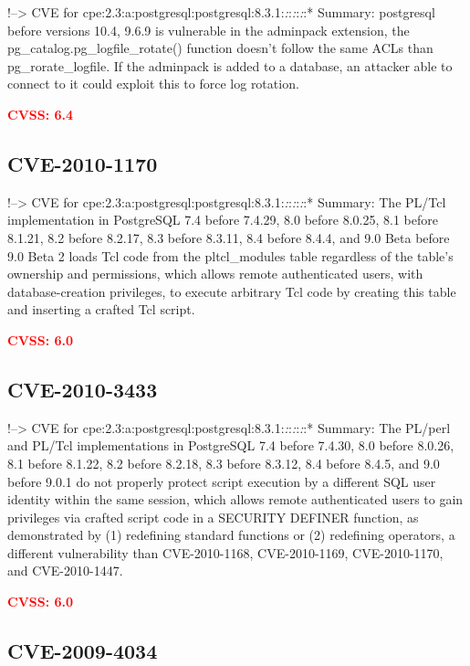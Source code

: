 \documentclass[a4paper, 12pt]{article}
\begin{document}
!--\textgreater{} CVE for
cpe:2.3:a:postgresql:postgresql:8.3.1:\emph{:}:\emph{:}:\emph{:}:*
Summary: postgresql before versions 10.4, 9.6.9 is vulnerable in the
adminpack extension, the pg\_catalog.pg\_logfile\_rotate() function
doesn't follow the same ACLs than pg\_rorate\_logfile. If the adminpack
is added to a database, an attacker able to connect to it could exploit
this to force log rotation.

\textbf{\textcolor{red}{CVSS: 6.4}}

\hypertarget{cve-2010-1170}{%
\subsection{CVE-2010-1170}\label{cve-2010-1170}}

!--\textgreater{} CVE for
cpe:2.3:a:postgresql:postgresql:8.3.1:\emph{:}:\emph{:}:\emph{:}:*
Summary: The PL/Tcl implementation in PostgreSQL 7.4 before 7.4.29, 8.0
before 8.0.25, 8.1 before 8.1.21, 8.2 before 8.2.17, 8.3 before 8.3.11,
8.4 before 8.4.4, and 9.0 Beta before 9.0 Beta 2 loads Tcl code from the
pltcl\_modules table regardless of the table's ownership and
permissions, which allows remote authenticated users, with
database-creation privileges, to execute arbitrary Tcl code by creating
this table and inserting a crafted Tcl script.

\textbf{\textcolor{red}{CVSS: 6.0}}

\hypertarget{cve-2010-3433}{%
\subsection{CVE-2010-3433}\label{cve-2010-3433}}

!--\textgreater{} CVE for
cpe:2.3:a:postgresql:postgresql:8.3.1:\emph{:}:\emph{:}:\emph{:}:*
Summary: The PL/perl and PL/Tcl implementations in PostgreSQL 7.4 before
7.4.30, 8.0 before 8.0.26, 8.1 before 8.1.22, 8.2 before 8.2.18, 8.3
before 8.3.12, 8.4 before 8.4.5, and 9.0 before 9.0.1 do not properly
protect script execution by a different SQL user identity within the
same session, which allows remote authenticated users to gain privileges
via crafted script code in a SECURITY DEFINER function, as demonstrated
by (1) redefining standard functions or (2) redefining operators, a
different vulnerability than CVE-2010-1168, CVE-2010-1169,
CVE-2010-1170, and CVE-2010-1447.

\textbf{\textcolor{red}{CVSS: 6.0}}

\hypertarget{cve-2009-4034}{%
\subsection{CVE-2009-4034}\label{cve-2009-4034}}
\end{document}
